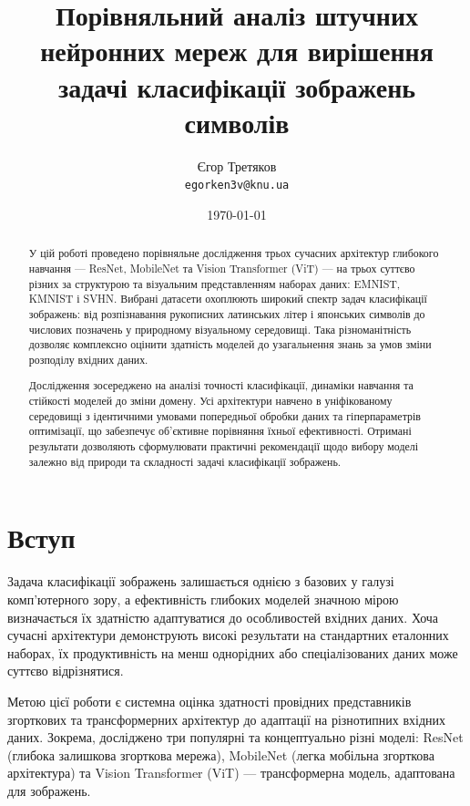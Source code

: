 \documentclass[14pt,a4paper]{extarticle}
\title{\textbf{Порівняльний аналіз штучних нейронних мереж для вирішення задачі класифікації зображень символів}}
\author{Єгор Третяков \\ \texttt{egorken3v@knu.ua}}
\date{\today}
\begin{document}
\maketitle


\begin{abstract}
У цій роботі проведено порівняльне дослідження трьох сучасних архітектур глибокого навчання — ResNet, MobileNet та Vision Transformer (ViT) — на трьох суттєво різних за структурою та візуальним представленням наборах даних: EMNIST, KMNIST і SVHN. Вибрані датасети охоплюють широкий спектр задач класифікації зображень: від розпізнавання рукописних латинських літер і японських символів до числових позначень у природному візуальному середовищі. Така різноманітність дозволяє комплексно оцінити здатність моделей до узагальнення знань за умов зміни розподілу вхідних даних.

Дослідження зосереджено на аналізі точності класифікації, динаміки навчання та стійкості моделей до зміни домену. Усі архітектури навчено в уніфікованому середовищі з ідентичними умовами попередньої обробки даних та гіперпараметрів оптимізації, що забезпечує об’єктивне порівняння їхньої ефективності. Отримані результати дозволяють сформулювати практичні рекомендації щодо вибору моделі залежно від природи та складності задачі класифікації зображень.
\end{abstract}



\newpage
\tableofcontents



\newpage
\section{Вступ}
\label{sec:introduction}
Задача класифікації зображень залишається однією з базових у галузі комп’ютерного зору, а ефективність глибоких моделей значною мірою визначається їх здатністю адаптуватися до особливостей вхідних даних. Хоча сучасні архітектури демонструють високі результати на стандартних еталонних наборах, їх продуктивність на менш однорідних або спеціалізованих даних може суттєво відрізнятися.

Метою цієї роботи є системна оцінка здатності провідних представників згорткових та трансформерних архітектур до адаптації на різнотипних вхідних даних. Зокрема, досліджено три популярні та концептуально різні моделі: ResNet (глибока залишкова згорткова мережа), MobileNet (легка мобільна згорткова архітектура) та Vision Transformer (ViT) — трансформерна модель, адаптована для зображень.
\end{document}

